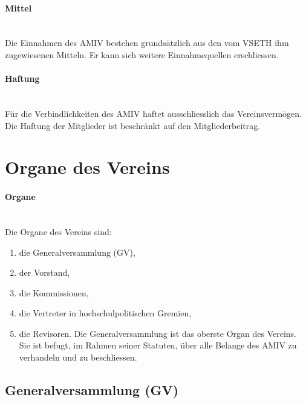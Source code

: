 \documentclass[a4paper,11pt]{article}
\begin{document}
\paragraph{Mittel} \ \\
Die Einnahmen des AMIV bestehen grundsätzlich aus den vom VSETH ihm zugewiesenen Mitteln. Er kann sich weitere Einnahmequellen erschliessen.


\paragraph{Haftung} \ \\
Für die Verbindlichkeiten des AMIV haftet ausschliesslich das Vereinsvermögen. Die Haftung der Mitglieder ist beschränkt auf den Mitgliederbeitrag.



\section{Organe des Vereins}
\paragraph{Organe}\label{Organe} \ \\
Die Organe des Vereins sind:
\begin{enumerate}
  \item die Generalversammlung (GV),
  \item der Vorstand,
  \item die Kommissionen,
  \item die Vertreter in hochschulpolitischen Gremien,
  \item die Revisoren.
  Die Generalversammlung ist das oberste Organ des Vereins. Sie ist befugt, im Rahmen seiner Statuten, über alle Belange des AMIV zu verhandeln und zu beschliessen.
\end{enumerate}


\subsection{Generalversammlung (GV)}
\end{document}
